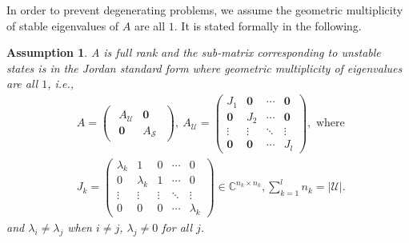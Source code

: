 \documentclass[12pt]{article}
\newcommand{\Cb}{{\mathbb{C}}}
\newcommand{\Uc}{{\mathcal{U}}}
\newcommand{\Sc}{{\mathcal{S}}}
\newtheorem{assumption}{\textbf{Assumption}}
\begin{document}
In order to prevent degenerating problems, we assume the geometric multiplicity of stable eigenvalues of $A$ are all $1$. It is stated formally in the following.
\begin{assumption}
	A is full rank and the sub-matrix corresponding to unstable states is in the Jordan standard form where geometric multiplicity of eigenvalues are all $1$, i.e.,
	\begin{align*}
		&A=
		\begin{pmatrix}
			\begin{array}{cc}
				A_\Uc & \mathbf{0} \\
				\mathbf{0} & A_{\Sc}			
			\end{array}
		\end{pmatrix}, \
		A_\Uc=\begin{pmatrix}
			J_{1} & \mathbf{0} & \cdots & \mathbf{0} \\
			\mathbf{0} & J_{2} & \cdots & \mathbf{0} \\
			\vdots & \vdots & \ddots & \vdots \\
			\mathbf{0} & \mathbf{0} & \cdots & J_{l} 
		\end{pmatrix},
		\text{ where }\\
		&
		J_k=
		\begin{pmatrix}
			\lambda_{k} & 1 & 0 & \cdots & {0} \\
			{0} & \lambda_{k} & 1 &  \cdots & {0} \\
			\vdots & \vdots &  \vdots & \ddots & \vdots \\
			{0} & {0} & {0} & \cdots & \lambda_{k} 
		\end{pmatrix}
		\in \Cb^{n_k \times n_k} , \sum_{k=1}^{l}n_k =|\Uc| .
	\end{align*}
	and $\lambda_i\neq \lambda_j$ when $i\neq j$, $\lambda_j\neq 0$ for all $j$.
\end{assumption}
\end{document}
